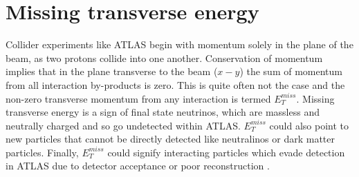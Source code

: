\section{Missing transverse energy}
Collider experiments like ATLAS begin with momentum solely in the plane of the beam, as two protons collide into one another. Conservation of momentum implies that in the plane transverse to the beam ($x-y$) the sum of momentum from all interaction by-products is zero. This is quite often not the case and the non-zero transverse momentum from any interaction is termed $E_T^{miss}$. Missing transverse energy is a sign of final state neutrinos, which are massless and neutrally charged and so go undetected within ATLAS. $E_T^{miss}$ could also point to new particles that cannot be directly detected like neutralinos or dark matter particles. Finally, $E_T^{miss}$ could signify interacting particles which evade detection in ATLAS due to detector acceptance or poor reconstruction \cite{METSig}. 

